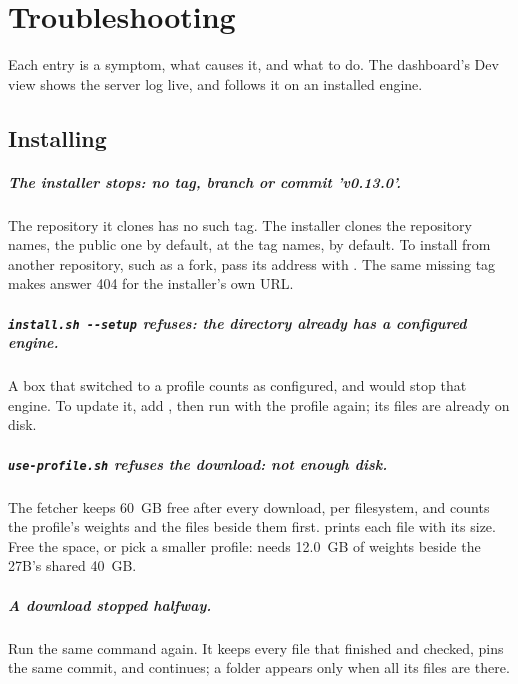 \chapter{Troubleshooting}\label{ch:troubleshooting}

Each entry is a symptom, what causes it, and what to do. The dashboard's Dev view shows the server log live, and  follows it on an installed engine.

\section{Installing}\label{sec:trouble-install}

\paragraph{The installer stops: no tag, branch or commit 'v0.13.0'.} The repository it clones has no such tag. The installer clones the repository  names, the public one by default, at the tag  names,  by default. To install from another repository, such as a fork, pass its address with . The same missing tag makes  answer 404 for the installer's own URL.

\paragraph{\texttt{install.sh -{}-setup} refuses: the directory already has a configured engine.} A box that switched to a profile counts as configured, and  would stop that engine. To update it, add , then run  with the profile again; its files are already on disk.

\paragraph{\texttt{use-profile.sh} refuses the download: not enough disk.} The fetcher keeps 60~GB free after every download, per filesystem, and counts the profile's weights and the files beside them first.  prints each file with its size. Free the space, or pick a smaller profile:  needs 12.0~GB of weights beside the 27B's shared 40~GB.

\paragraph{A download stopped halfway.} Run the same  command again. It keeps every file that finished and checked, pins the same commit, and continues; a folder appears only when all its files are there.

